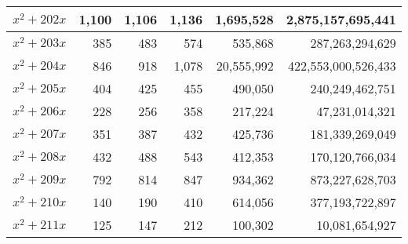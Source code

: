 \documentclass{article}
\begin{document}
\begin{center}
\begin{tabular}{ | c | r | r | r | r | r | }
$x^2 + 202x$ & 1{,}100 & 1{,}106 & 1{,}136 & 1{,}695{,}528 & 2{,}875{,}157{,}695{,}441 \\ \hline
$x^2 + 203x$ & 385 & 483 & 574 & 535{,}868 & 287{,}263{,}294{,}629 \\ \hline
$x^2 + 204x$ & 846 & 918 & 1{,}078 & 20{,}555{,}992 & 422{,}553{,}000{,}526{,}433 \\ \hline
$x^2 + 205x$ & 404 & 425 & 455 & 490{,}050 & 240{,}249{,}462{,}751 \\ \hline
$x^2 + 206x$ & 228 & 256 & 358 & 217{,}224 & 47{,}231{,}014{,}321 \\ \hline
$x^2 + 207x$ & 351 & 387 & 432 & 425{,}736 & 181{,}339{,}269{,}049 \\ \hline
$x^2 + 208x$ & 432 & 488 & 543 & 412{,}353 & 170{,}120{,}766{,}034 \\ \hline
$x^2 + 209x$ & 792 & 814 & 847 & 934{,}362 & 873{,}227{,}628{,}703 \\ \hline
$x^2 + 210x$ & 140 & 190 & 410 & 614{,}056 & 377{,}193{,}722{,}897 \\ \hline
$x^2 + 211x$ & 125 & 147 & 212 & 100{,}302 & 10{,}081{,}654{,}927 \\ \hline

\end{tabular}\pagebreak

\begin{tabular}{ | c | r | r | r | r | r | }
\hline


\end{tabular}
\end{center}
\end{document}
